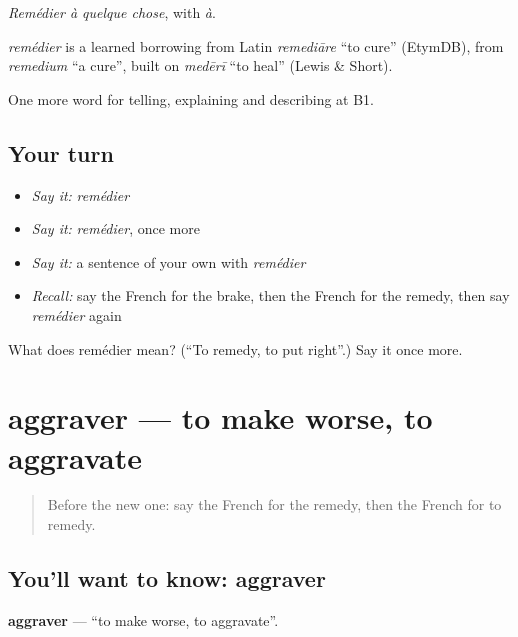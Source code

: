 \emph{Remédier à quelque chose}, with \emph{à}.

\begin{cousinweb}
\emph{remédier} is a learned borrowing from Latin \emph{remediāre} \textquotedblleft{}to cure\textquotedblright{} (EtymDB), from \emph{remedium} \textquotedblleft{}a cure\textquotedblright{}, built on \emph{medērī} \textquotedblleft{}to heal\textquotedblright{} (Lewis \& Short).
\end{cousinweb}

\begin{grammarlens}[title={What you've built}]
One more word for telling, explaining and describing at B1.
\end{grammarlens}

\subsection*{Your turn}
\begin{itemize}
\raggedright
  \item \emph{Say it:} \emph{remédier}
  \item \emph{Say it:} \emph{remédier}, once more
  \item \emph{Say it:} a sentence of your own with \emph{remédier}
  \item \emph{Recall:} say the French for the brake, then the French for the remedy, then say \emph{remédier} again
\end{itemize}

\begin{tcolorbox}[breakable,colback=teal!4,colframe=teal!35!black,title={Before you move on}]
What does remédier mean? (\textquotedblleft{}To remedy, to put right\textquotedblright{}.) Say it once more.
\end{tcolorbox}
\section[aggraver]{aggraver — to make worse, to aggravate}

\label{lesson:FR-C353-aggraver}



\begin{quote}
Before the new one: say the French for the remedy, then the French for to remedy.
\end{quote}

\subsection*{You'll want to know: aggraver}
\textbf{aggraver} — \textquotedblleft{}to make worse, to aggravate\textquotedblright{}.


